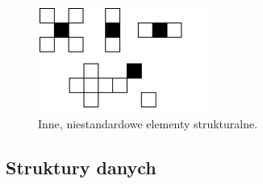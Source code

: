 \documentclass[12pt,a4paper,twoside]{article}
\begin{document}
\begin{figure}[hbt!]
  \centering
  \includegraphics[width=0.5\textwidth]{grafika2.png}
  \caption{Inne, niestandardowe elementy strukturalne.}  \label{fig:grafika2}
\end{figure}


\clearpage
	
\subsection{Struktury danych}
\end{document}
